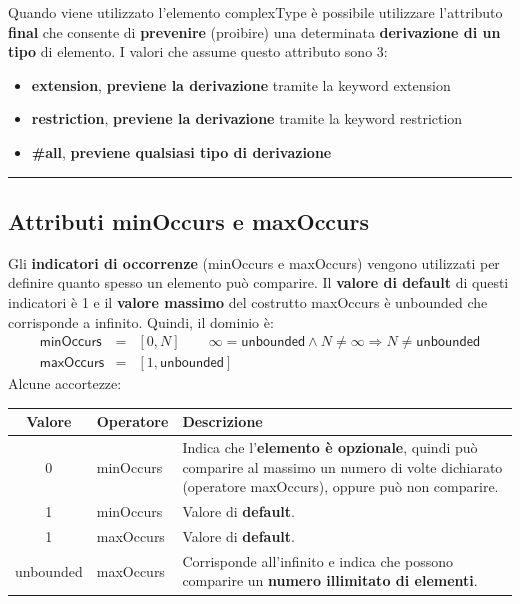 \documentclass[a4paper]{article}
\newcommand{\longline}{\noindent\rule{\textwidth}{0.4pt}}
\begin{document}
	Quando viene utilizzato l'elemento \textsf{complexType} è possibile utilizzare l'attributo \textcolor{Red3}{\textbf{\textsf{final}}} che consente di \textbf{prevenire} (proibire) una determinata \textbf{derivazione di un tipo} di elemento. I valori che assume questo attributo sono 3:
	\begin{itemize}
		\item \textsf{\textbf{extension}}, \textbf{previene la derivazione} tramite la keyword \textsf{extension}
		
		\item \textsf{\textbf{restriction}}, \textbf{previene la derivazione} tramite la keyword \textsf{restriction}
		
		\item \textsf{\textbf{\#all}}, \textbf{previene qualsiasi tipo di derivazione}
	\end{itemize}
	
	\longline
	
	\subsection{Attributi \textsf{minOccurs} e \textsf{maxOccurs}}
	
	Gli \textcolor{Red3}{\textbf{indicatori di occorrenze}} (\textsf{minOccurs} e \textsf{maxOccurs}) vengono utilizzati per definire quanto spesso un elemento può comparire. Il \textbf{valore di default} di questi indicatori è 1 e il \textbf{valore massimo} del costrutto \textsf{maxOccurs} è \textsf{unbounded} che corrisponde a infinito. Quindi, il dominio è:
	\begin{equation*}
		\begin{array}{lll}
			\textsf{minOccurs} &=& \left[0, N\right] \hspace{2em} \infty = \textsf{unbounded} \land N \neq \infty \Longrightarrow N \neq \textsf{unbounded} \\
			\textsf{maxOccurs} &=& \left[1,\textsf{unbounded}\right]
		\end{array}
	\end{equation*}
	Alcune accortezze:
	\begin{table}[!htp]
		\centering
		\begin{tabular}{@{} c l p{18em} @{}}
			\toprule
			Valore 	& Operatore & Descrizione \\
			\midrule
			0		& \textsf{minOccurs}	& Indica che l'\textbf{elemento è opzionale}, quindi può comparire al massimo un numero di volte dichiarato (operatore \textsf{maxOccurs}), oppure può non comparire. \\ [0.5em]
			1		& \textsf{minOccurs}	& Valore di \textbf{default}. \\ [0.5em]
			1		& \textsf{maxOccurs}	& Valore di \textbf{default}. \\ [0.5em]
			\textsf{unbounded} & \textsf{maxOccurs} & Corrisponde all'infinito e indica che possono comparire un \textbf{numero illimitato di elementi}. \\
			\bottomrule
		\end{tabular}
	\end{table}\newpage
	
\end{document}
